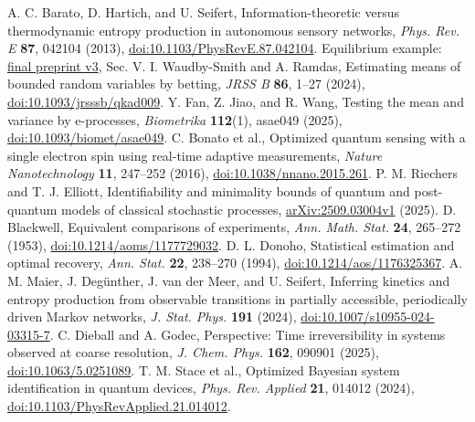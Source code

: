  A. C. Barato, D. Hartich, and U. Seifert, Information-theoretic versus thermodynamic entropy production in autonomous sensory networks, \emph{Phys. Rev. E} \textbf{87}, 042104 (2013), \href{https://doi.org/10.1103/PhysRevE.87.042104}{doi:10.1103/PhysRevE.87.042104}. Equilibrium example: \href{https://arxiv.org/html/1212.3186v3}{final preprint v3}, Sec. V.
 I. Waudby-Smith and A. Ramdas, Estimating means of bounded random variables by betting, \emph{JRSS B} \textbf{86}, 1--27 (2024), \href{https://doi.org/10.1093/jrsssb/qkad009}{doi:10.1093/jrsssb/qkad009}.
 Y. Fan, Z. Jiao, and R. Wang, Testing the mean and variance by e-processes, \emph{Biometrika} \textbf{112}(1), asae049 (2025), \href{https://doi.org/10.1093/biomet/asae049}{doi:10.1093/biomet/asae049}.
 C. Bonato et al., Optimized quantum sensing with a single electron spin using real-time adaptive measurements, \emph{Nature Nanotechnology} \textbf{11}, 247--252 (2016), \href{https://doi.org/10.1038/nnano.2015.261}{doi:10.1038/nnano.2015.261}.
 P. M. Riechers and T. J. Elliott, Identifiability and minimality bounds of quantum and post-quantum models of classical stochastic processes, \href{https://arxiv.org/abs/2509.03004v1}{arXiv:2509.03004v1} (2025).
 D. Blackwell, Equivalent comparisons of experiments, \emph{Ann. Math. Stat.} \textbf{24}, 265--272 (1953), \href{https://doi.org/10.1214/aoms/1177729032}{doi:10.1214/aoms/1177729032}.
 D. L. Donoho, Statistical estimation and optimal recovery, \emph{Ann. Stat.} \textbf{22}, 238--270 (1994), \href{https://doi.org/10.1214/aos/1176325367}{doi:10.1214/aos/1176325367}.
 A. M. Maier, J. Deg\"unther, J. van der Meer, and U. Seifert, Inferring kinetics and entropy production from observable transitions in partially accessible, periodically driven Markov networks, \emph{J. Stat. Phys.} \textbf{191} (2024), \href{https://doi.org/10.1007/s10955-024-03315-7}{doi:10.1007/s10955-024-03315-7}.
 C. Dieball and A. Godec, Perspective: Time irreversibility in systems observed at coarse resolution, \emph{J. Chem. Phys.} \textbf{162}, 090901 (2025), \href{https://doi.org/10.1063/5.0251089}{doi:10.1063/5.0251089}.
 T. M. Stace et al., Optimized Bayesian system identification in quantum devices, \emph{Phys. Rev. Applied} \textbf{21}, 014012 (2024), \href{https://doi.org/10.1103/PhysRevApplied.21.014012}{doi:10.1103/PhysRevApplied.21.014012}.
